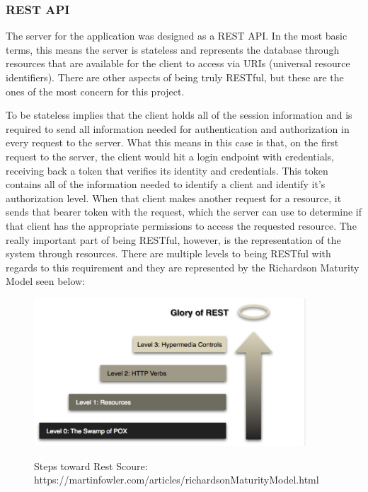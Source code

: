{{{{{{{\subsubsection{REST API}
 The server for the application was designed as a REST API. In the most basic terms, this means the server is stateless and represents the database through resources that are available for the client to access via URIs (universal resource identifiers). There are other aspects of being truly RESTful, but these are the ones of the most concern for this project.
\newline
{\setlength{\parindent}{0cm}

To be stateless implies that the client holds all of the session information and is required to send all information needed for authentication and authorization in every request to the server. What this means in this case is that, on the first request to the server, the client would hit a login endpoint with credentials, receiving back a token that verifies its identity and credentials. This token contains all of the information needed to identify a client and identify it’s authorization level. When that client makes another request for a resource, it sends that bearer token with the request, which the server can use to determine if that client has the appropriate permissions to access the requested resource.
The really important part of being RESTful, however, is the representation of the system through resources. There are multiple levels to being RESTful with regards to this requirement and they are represented by the Richardson Maturity Model seen below:
\begin{figure}[H]
	\centering
	\includegraphics[width=4in]{rest.png}\\
	\caption{Steps toward Rest Scoure: https://martinfowler.com/articles/richardsonMaturityModel.html}
	\label{fig:tobias}
\end{figure}

}}}}}}}}
